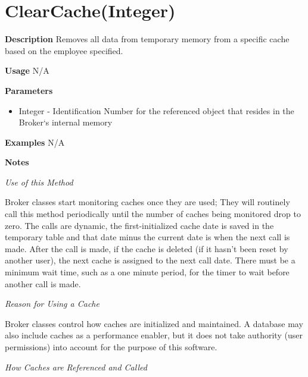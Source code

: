 \documentclass[letterpaper,12pt]{report}
\begin{document}
{
\pagebreak
\section{ClearCache(Integer)}
    \begin{description}
     \item \textbf{Description}
	\newline \hspace*{1cm} Removes all data from temporary memory from a specific cache based on the employee specified.
     \item \textbf{Usage}
	\newline \hspace*{1cm} N/A
     \item \textbf{Parameters}
	 \begin{itemize}
	   \item Integer - Identification Number for the referenced object that resides in the Broker`s internal memory
	  \end{itemize}
     \item \textbf{Examples}
	\newline \hspace*{1cm} N/A
     \item \textbf{Notes}
	\par \noindent 
	\textit{Use of this Method} 
	\par \noindent \hspace*{1cm} Broker classes start monitoring caches once they are used; They will routinely call this method periodically until the number of caches being monitored drop to zero. The calls are dynamic, the first-initialized cache date is saved in the temporary table and that date minus the current date is when the next call is made. After the call is made, if the cache is deleted (if it hasn't been reset by another user), the next cache is assigned to the next call date. There must be a minimum wait time, such as a one minute period, for the timer to wait before another call is made.
	\par \noindent
	\textit{Reason for Using a Cache} 
	\par \noindent \hspace*{1cm} Broker classes control how caches are initialized and maintained. A database may also include caches as a performance enabler, but it does not take authority (user permissions) into account for the purpose of this software. 
	\par \noindent
	\textit{How Caches are Referenced and Called}

\end{description}}
\end{document}
